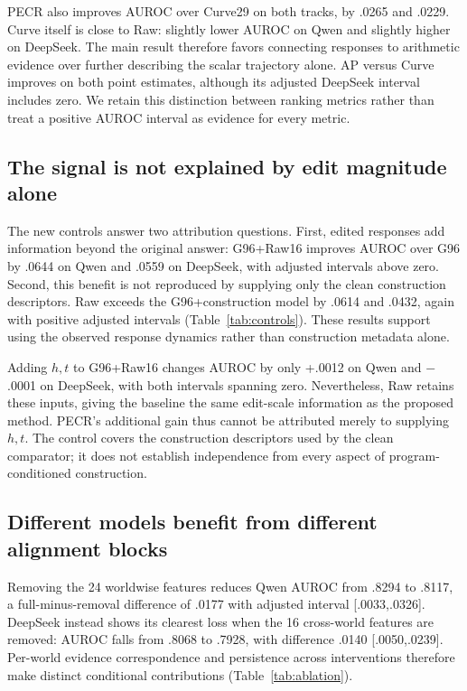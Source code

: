 PECR also improves AUROC over Curve29 on both tracks, by .0265 and .0229. Curve itself is close to Raw: slightly lower AUROC on Qwen and slightly higher on DeepSeek. The main result therefore favors connecting responses to arithmetic evidence over further describing the scalar trajectory alone. AP versus Curve improves on both point estimates, although its adjusted DeepSeek interval includes zero. We retain this distinction between ranking metrics rather than treat a positive AUROC interval as evidence for every metric.

\subsection{The signal is not explained by edit magnitude alone}

The new controls answer two attribution questions. First, edited responses add information beyond the original answer: G96+Raw16 improves AUROC over G96 by .0644 on Qwen and .0559 on DeepSeek, with adjusted intervals above zero. Second, this benefit is not reproduced by supplying only the clean construction descriptors. Raw exceeds the G96+construction model by .0614 and .0432, again with positive adjusted intervals (Table~\ref{tab:controls}). These results support using the observed response dynamics rather than construction metadata alone.

Adding $h,t$ to G96+Raw16 changes AUROC by only +.0012 on Qwen and $-$.0001 on DeepSeek, with both intervals spanning zero. Nevertheless, Raw retains these inputs, giving the baseline the same edit-scale information as the proposed method. PECR's additional gain thus cannot be attributed merely to supplying $h,t$. The control covers the construction descriptors used by the clean comparator; it does not establish independence from every aspect of program-conditioned construction.

\subsection{Different models benefit from different alignment blocks}

Removing the 24 worldwise features reduces Qwen AUROC from .8294 to .8117, a full-minus-removal difference of .0177 with adjusted interval [.0033,.0326]. DeepSeek instead shows its clearest loss when the 16 cross-world features are removed: AUROC falls from .8068 to .7928, with difference .0140 [.0050,.0239]. Per-world evidence correspondence and persistence across interventions therefore make distinct conditional contributions (Table~\ref{tab:ablation}).

